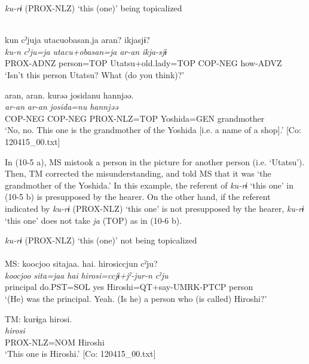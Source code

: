 \ea\label{ex:10.5}   \textit{ku-rɨ} (PROX-NLZ) ‘this (one)’ being topicalized\\\\
  \begin{xlist}[b. TM:]
   \glll kun  cˀjuja  utacuobasan.ja  aran?  ikjasjɨ?\\
      \textit{ku-n}  \textit{cˀju=ja}  \textit{utacu+obasan=ja}  \textit{ar-an}  \textit{ikja-sjɨ}\\
      PROX-ADNZ  person=TOP  Utatsu+old.lady=TOP  COP-NEG  how-ADVZ\\
      \glt ‘Isn’t this person Utatsu? What (do you think)?’

    \glll    aran,  aran.  kurəə  josidanu  hannjəə.\\
      \textit{ar-an}  \textit{ar-an}  \textit{}  \textit{josida=nu}  \textit{hannjəə}\\
      COP-NEG  COP-NEG  PROX-NLZ=TOP  Yoshida=GEN  grandmother\\
      \glt       ‘No, no. This one is the grandmother of the Yoshida [i.e. a name of a shop].’ [Co: 120415\_00.txt]
  \end{xlist}
\z

In (10-5 a), MS mistook a person in the picture for another person (i.e. ‘Utatsu’). Then, TM corrected the misunderstanding, and told MS that it was ‘the grandmother of the Yoshida.’ In this example, the referent of \textit{ku-rɨ} ‘this one’ in (10-5 b) is presupposed by the hearer. On the other hand, if the referent indicated by \textit{ku-rɨ} (PROX-NLZ) ‘this one’ is not presupposed by the hearer, \textit{ku-rɨ} ‘this one’ does not take \textit{ja} (TOP) as in (10-6 b).

\ea\label{ex:10.6}   \textit{ku-rɨ} (PROX-NLZ) ‘this (one)’ not being topicalized\\\\
  \ea MS: \glll {\textbar}koocjoo  sita{\textbar}jaa.  {\textbar}hai{\textbar}.  hirosiccjun  cˀju?\\
      \textit{koocjoo}  \textit{sita=jaa}  \textit{hai}  \textit{hirosi=ccjɨ+jˀ-jur-n}  \textit{cˀju}\\
      principal  do.PST=SOL  yes  Hiroshi=QT+say-UMRK-PTCP  person\\
      \glt ‘(He) was the principal. Yeah. (Is he) a person who (is called) Hiroshi?’

  \ex  TM: \glll    kurɨga  hirosi.\\
      \textit{}  \textit{hirosi}\\
      PROX-NLZ=NOM  Hiroshi\\
      \glt       ‘This one is Hiroshi.’ [Co: 120415\_00.txt]
    \z
\z


